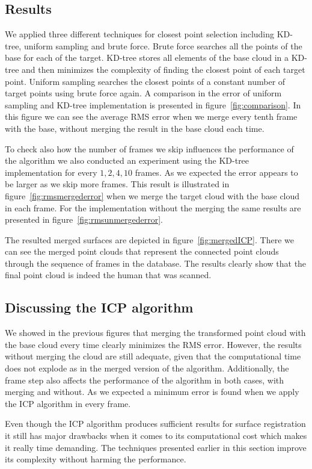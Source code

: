 \subsection{Results}
We applied three different techniques for closest point selection including KD-tree, uniform sampling and brute force. Brute force searches all the points of the base for each of the target. KD-tree stores all elements of the base cloud in a KD-tree and then minimizes the complexity of finding the closest point of each target point. Uniform sampling searches the closest points of a constant number of target points using brute force again. A comparison in the error of uniform sampling and KD-tree implementation is presented in figure~\ref{fig:comparison}. In this figure we can see the average RMS error when we merge every tenth frame with the base, without merging the result in the base cloud each time.

To check also how the number of frames we skip influences the performance of the algorithm we also conducted an experiment using the KD-tree implementation for every $1,2,4,10$ frames. As we expected the error appears to be larger as we skip more frames. This result is illustrated in figure~\ref{fig:rmsmergederror} when we merge the target cloud with the base cloud in each frame. For the implementation without the merging the same results are presented in figure~\ref{fig:rmsunmergederror}.

The resulted merged surfaces are depicted in figure~\ref{fig:mergedICP}. There we can see the merged point clouds that represent the connected point clouds through the sequence of frames in the database. The results clearly show that the final point cloud is indeed the human that was scanned.


\subsection{Discussing the ICP algorithm}
We showed in the previous figures that merging the  transformed point cloud with the base cloud every time clearly minimizes the RMS error. However, the results without merging the cloud are still adequate, given that the computational time does not explode as in the merged version of the algorithm. Additionally, the frame step also affects the performance of the algorithm in both cases, with merging and without. As we expected a minimum error is found when we apply the ICP algorithm in every frame.

Even though the ICP algorithm produces sufficient results for surface registration it still has major drawbacks when it comes to its computational cost which makes it really time demanding. The techniques presented earlier in this section improve its complexity without harming the performance.

